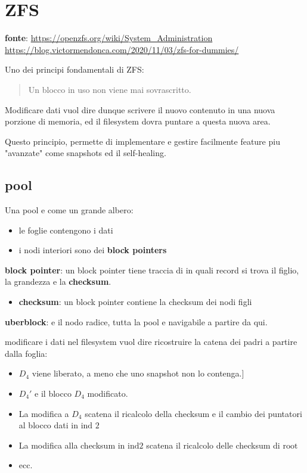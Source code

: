 \section{ZFS}\label{zfs}

\textbf{fonte}:
\href{https://openzfs.github.io/openzfs-docs/Basic\%20Concepts/Copy-on-write.html}{\url{https://openzfs.org/wiki/System_Administration}}
\url{https://blog.victormendonca.com/2020/11/03/zfs-for-dummies/}

Uno dei principi fondamentali di ZFS:

\begin{quote}
Un blocco in uso non viene mai sovrascritto.
\end{quote}

Modificare dati vuol dire dunque scrivere il nuovo contenuto in una
nuova porzione di memoria, ed il filesystem dovra puntare a questa nuova
area.

Questo principio, permette di implementare e gestire facilmente feature
piu "avanzate" come snapshots ed il self-healing.

\subsection{pool}\label{pool}

Una pool e\textquotesingle{} come un grande albero:

\begin{itemize}
\tightlist
\item
  le foglie contengono i dati
\item
  i nodi interiori sono dei \textbf{block pointers}
\end{itemize}

\textbf{block pointer}: un block pointer tiene traccia di in quali
record si trova il figlio, la grandezza e la \textbf{checksum}.

\begin{itemize}
\tightlist
\item
  \textbf{checksum}: un block pointer contiene la checksum dei nodi
  figli
\end{itemize}

\textbf{uberblock}: e\textquotesingle{} il nodo radice, tutta la pool
e\textquotesingle{} navigabile a partire da qui.

modificare i dati nel filesystem vuol dire ricostruire la catena dei
padri a partire dalla foglia:

\begin{itemize}
\tightlist
\item
  \(D_{4}\) viene liberato, a meno che uno snapshot non lo contenga.{]}
\item
  \(D_{4}'\) e\textquotesingle{} il blocco \(D_{4}\) modificato.
\item
  La modifica a \(D_{4}\) scatena il ricalcolo della checksum e il
  cambio dei puntatori al blocco dati in \(\text{ind 2}\)
\item
  La modifica alla checksum in \(\text{ind2}\) scatena il ricalcolo
  delle checksum di \(\text{root}\)
\item
  ecc.
\end{itemize}

